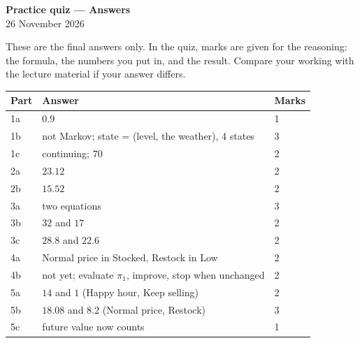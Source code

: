 \documentclass[11pt,a4paper]{article}
\begin{document}
\begin{center}{\Large\bfseries Practice quiz --- Answers}\\[3pt] 26 November 2026\end{center}
These are the final answers only. In the quiz, marks are given for the reasoning: the formula, the numbers you put in,
and the result. Compare your working with the lecture material if your answer differs.

\begin{center}
\begin{tabular}{lll}\toprule Part & Answer & Marks\\ \midrule
1a & $0.9$ & 1\\ 1b & not Markov; state = (level, the weather), 4 states & 3\\ 1c & continuing; $70$ & 2\\
2a & $23.12$ & 2\\ 2b & $15.52$ & 2\\
3a & two equations & 3\\ 3b & $32$ and $17$ & 2\\ 3c & $28.8$ and $22.6$ & 2\\
4a & Normal price in Stocked, Restock in Low & 2\\ 4b & not yet; evaluate $\pi_1$, improve, stop when unchanged & 2\\
5a & $14$ and $1$ (Happy hour, Keep selling) & 2\\ 5b & $18.08$ and $8.2$ (Normal price, Restock) & 3\\ 5c & future value now counts & 1\\
\bottomrule\end{tabular}
\end{center}
\end{document}
